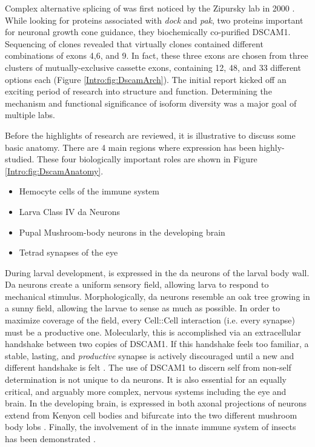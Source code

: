     Complex alternative splicing of\dscam{} was first noticed by the Zipursky lab in 2000 \citep{Schmucker2000}. While looking for proteins associated with \textit{dock} and \textit{pak}, two proteins important for neuronal growth cone guidance, they biochemically co-purified DSCAM1. Sequencing of \dscam{} clones revealed that virtually clones contained different combinations of exons 4,6, and 9. In fact, these three exons are chosen from three clusters of mutually-exclusive cassette exons, containing 12, 48, and 33 different options each (Figure \ref{Intro:fig:DscamArch}). The initial report kicked off an exciting period of research into \dscam{} structure and function. Determining the mechanism and functional significance of \dscam{} isoform diversity was a major goal of multiple labs.

    Before the highlights of \dscam{} research are reviewed, it is illustrative to discuss some basic \flies{} anatomy. There are 4 main regions where \dscam{} expression has been highly-studied. These four biologically important roles are shown in Figure \ref{Intro:fig:DscamAnatomy}.

    \begin{itemize} \itemsep0.5pt \parskip0pt  %
      \item Hemocyte cells of the immune system
      \item Larva Class IV da Neurons 
      \item Pupal Mushroom-body neurons in the developing brain
      \item Tetrad synapses of the eye
      \end{itemize}

    During larval development, \dscam{} is expressed in the da neurons of the larval body wall. Da neurons create a uniform sensory field, allowing larva to respond to mechanical stimulus. Morphologically, da neurons resemble an oak tree growing in a sunny field, allowing the larvae to sense as much as possible. In order to maximize coverage of the field, every Cell::Cell interaction (i.e. every synapse) must be a productive one. Molecularly, this is accomplished via an extracellular handshake between two copies of DSCAM1. If this handshake feels too familiar, a stable, lasting, and \textit{productive} synapse is actively discouraged until a new and different handshake is felt \citep{Wojtowicz2004}. The use of DSCAM1 to discern self from non-self determination is not unique to da neurons. It is also essential for an equally critical, and arguably more complex, nervous systems including the eye and brain. In the developing brain, \dscam{} is expressed in both axonal projections of neurons extend from Kenyon cell bodies and bifurcate into the two different mushroom body lobs \citep{Zhan2004}. Finally, the involvement of \dscam{} in the innate immune system of insects has been demonstrated \citep{Watson2005,Dong2006}.

